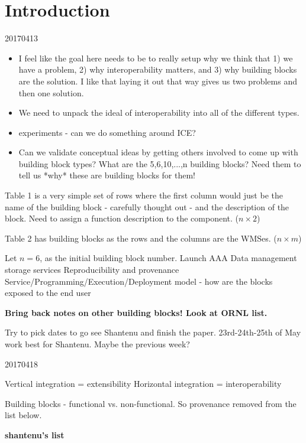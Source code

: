 \section{Introduction}

20170413
\begin{itemize}
\item I feel like the goal here needs to be to really setup why we think that 1) we have a problem, 2) why interoperability matters, and 3) why building blocks are the solution. I like that laying it out that way gives us two problems and then one solution.
\item We need to unpack the ideal of interoperability into all of the different types.
\item experiments - can we do something around ICE?
\item Can we validate conceptual ideas by getting others involved to come up with building block types? What are the 5,6,10,...,n building blocks? Need them to tell us *why* these are building blocks for them!
\end{itemize}

Table 1 is a very simple set of rows where the first column would just be the name of the building block - carefully thought out - and the description of the block. Need to assign a function description to the component. ($n \times 2$)

Table 2 has building blocks as the rows and the columns are the WMSes. ($n \times m$)

Let $n = 6$, as the initial building block number.
Launch
AAA
Data management storage services
Reproducibility and provenance
Service/Programming/Execution/Deployment model - how are the blocks exposed to the end user

\textbf{Bring back notes on other building blocks! Look at ORNL list.}

Try to pick dates to go see Shantenu and finish the paper. 23rd-24th-25th of May work best for Shantenu. Maybe the previous week?

20170418

Vertical integration = extensibility
Horizontal integration = interoperability

Building blocks - functional vs. non-functional. So provenance removed from the list below.

{\bf shantenu's list}


